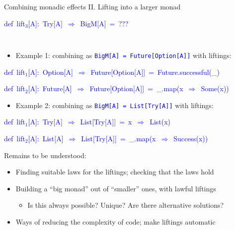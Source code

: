 \documentclass[english]{beamer}
\newenvironment{lyxcode}
  {\par\begin{list}{}{
    \setlength{\rightmargin}{\leftmargin}
    \setlength{\listparindent}{0pt}%
    \raggedright
    \setlength{\itemsep}{0pt}
    \setlength{\parsep}{0pt}
    \normalfont\ttfamily}%
   \def\{{\char`\{}
   \def\}{\char`\}}
   \def\textasciitilde{\char`\~}
   \item[]}
  {\end{list}}
\begin{document}
\begin{frame}{Combining monadic effects II. Lifting into a larger monad}
\begin{minipage}[t]{0.49\columnwidth}
\begin{lyxcode}
\textcolor{blue}{\footnotesize{}def~lift$_{3}${[}A{]}:~Try{[}A{]}~$\Rightarrow$~BigM{[}A{]}~=~???~~~}{\footnotesize\par}
\end{lyxcode}
%
\end{minipage}\texttt{\textcolor{blue}{\footnotesize{}\medskip{}
}}{\footnotesize\par}
\begin{itemize}
\item Example 1: combining as \texttt{\textcolor{blue}{\footnotesize{}BigM{[}A{]}
= Future{[}Option{[}A{]}{]}}} with liftings:
\end{itemize}
\begin{lyxcode}
{\footnotesize{}\vspace{-0.4cm}}\textcolor{blue}{\footnotesize{}def~lift$_{1}${[}A{]}:~Option{[}A{]}~$\Rightarrow$~Future{[}Option{[}A{]}{]}~=~Future.successful(\_)}{\footnotesize\par}

\textcolor{blue}{\footnotesize{}def~lift$_{2}${[}A{]}:~Future{[}A{]}~$\Rightarrow$~Future{[}Option{[}A{]}{]}~=~\_.map(x~$\Rightarrow$~Some(x))}{\footnotesize\par}
\end{lyxcode}
\begin{itemize}
\item {\footnotesize{}\vspace{-0.15cm}}Example 2: combining as \texttt{\textcolor{blue}{\footnotesize{}BigM{[}A{]}
= List{[}Try{[}A{]}{]}}} with liftings:
\end{itemize}
\begin{lyxcode}
{\footnotesize{}\vspace{-0.05cm}}\textcolor{blue}{\footnotesize{}def~lift$_{1}${[}A{]}:~Try{[}A{]}~$\Rightarrow$~List{[}Try{[}A{]}{]}~=~x~$\Rightarrow$~List(x)}{\footnotesize\par}

\textcolor{blue}{\footnotesize{}def~lift$_{2}${[}A{]}:~List{[}A{]}~$\Rightarrow$~List{[}Try{[}A{]}{]}~=~\_.map(x~$\Rightarrow$~Success(x))}{\footnotesize\par}
\end{lyxcode}
{\footnotesize{}\vspace{-0.1cm}}Remains to be understood:
\begin{itemize}
\item Finding suitable laws for the liftings; checking that the laws hold
\item Building a ``big monad'' out of ``smaller'' ones, with lawful
liftings
\begin{itemize}
\item Is this always possible? Unique? Are there alternative solutions?
\end{itemize}
\item Ways of reducing the complexity of code; make liftings automatic
\end{itemize}
\end{frame}
\end{document}
